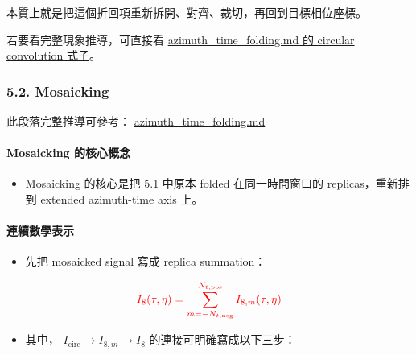 \documentclass[11pt]{article}
\providecommand{\tightlist}{%
  \setlength{\itemsep}{0pt}\setlength{\parskip}{0pt}}
\begin{document}
本質上就是把這個折回項重新拆開、對齊、裁切，再回到目標相位座標。

若要看完整現象推導，可直接看
\href{./azimuth_time_folding.md\#6-circular-convolution-and-wrap-around}{azimuth\_time\_folding.md
的 circular convolution 式子}。

\hypertarget{mosaicking-1}{%
\subsubsection{5.2. Mosaicking}\label{mosaicking-1}}

此段落完整推導可參考：
\href{./azimuth_time_folding.md}{azimuth\_time\_folding.md}

\hypertarget{mosaicking-ux7684ux6838ux5fc3ux6982ux5ff5-1}{%
\paragraph{Mosaicking
的核心概念}\label{mosaicking-ux7684ux6838ux5fc3ux6982ux5ff5-1}}

\begin{itemize}
\tightlist
\item
  Mosaicking 的核心是把 5.1 中原本 folded 在同一時間窗口的
  replicas，重新排到 extended azimuth-time axis 上。
\end{itemize}

\hypertarget{ux9023ux7e8cux6578ux5b78ux8868ux793a}{%
\paragraph{連續數學表示}\label{ux9023ux7e8cux6578ux5b78ux8868ux793a}}

\begin{itemize}
\tightlist
\item
  先把 mosaicked signal 寫成 replica summation：
\end{itemize}

\begin{equation}
\begin{aligned}
{\color{red}{I_8(\tau,\eta)=\sum_{m=-N_{t,\mathrm{neg}}}^{N_{t,\mathrm{pos}}}I_{8,m}(\tau,\eta)}}
\end{aligned}
\end{equation}

\begin{itemize}
\tightlist
\item
  其中， \(I_{\mathrm{circ}} \rightarrow I_{8,m} \rightarrow I_8\)
  的連接可明確寫成以下三步：
\end{itemize}
\end{document}
